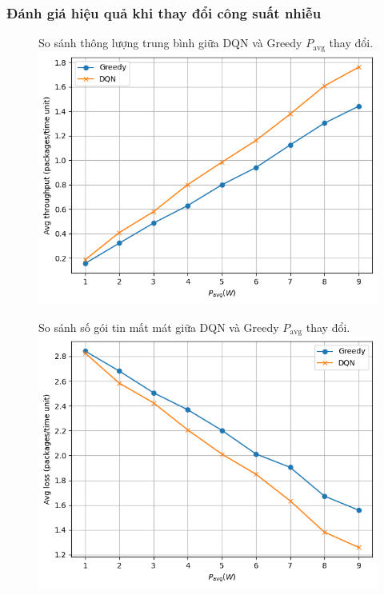 \documentclass{uetgraduation}
\begin{document}
\subsubsection{Đánh giá hiệu quả khi thay đổi công suất nhiễu}
\begin{figure}{So sánh thông lượng trung bình giữa DQN và Greedy $P_\text{avg}$ thay đổi.}
    \centering
    \includegraphics[scale=0.8]{p_avg_throughput}
    \label{fig:p_avg_throughput}
\end{figure}
\begin{figure}{So sánh số gói tin mất mát giữa DQN và Greedy $P_\text{avg}$ thay đổi.}
    \centering
    \includegraphics[scale=0.8]{p_avg_loss}
    \label{fig:p_avg_loss}
\end{figure}
\end{document}
